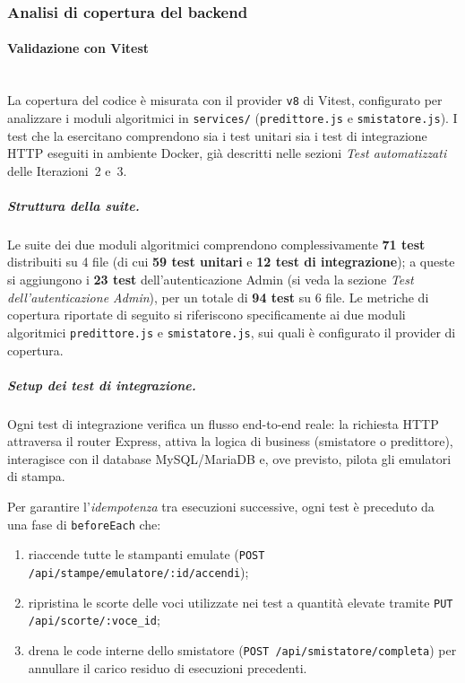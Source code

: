 
\subsubsection{Analisi di copertura del backend}

\paragraph{Validazione con Vitest}\mbox{}\\
La copertura del codice è misurata con il provider \texttt{v8} di Vitest, configurato per analizzare i moduli algoritmici in \texttt{services/} (\texttt{predittore.js} e \texttt{smistatore.js}). I test che la esercitano comprendono sia i test unitari sia i test di integrazione HTTP eseguiti in ambiente Docker, già descritti nelle sezioni \emph{Test automatizzati} delle Iterazioni~2 e~3.

\subparagraph{Struttura della suite.}
Le suite dei due moduli algoritmici comprendono complessivamente \textbf{71 test} distribuiti su 4 file (di cui \textbf{59 test unitari} e \textbf{12 test di integrazione}); a queste si aggiungono i \textbf{23 test} dell'autenticazione Admin (si veda la sezione \emph{Test dell'autenticazione Admin}), per un totale di \textbf{94 test} su 6 file. Le metriche di copertura riportate di seguito si riferiscono specificamente ai due moduli algoritmici \texttt{predittore.js} e \texttt{smistatore.js}, sui quali è configurato il provider di copertura.

\subparagraph{Setup dei test di integrazione.}
Ogni test di integrazione verifica un flusso end-to-end reale: la richiesta HTTP attraversa il router Express, attiva la logica di business (smistatore o predittore), interagisce con il database MySQL/MariaDB e, ove previsto, pilota gli emulatori di stampa.

Per garantire l'\emph{idempotenza} tra esecuzioni successive, ogni test è preceduto da una fase di \texttt{beforeEach} che:
\begin{enumerate}
    \item riaccende tutte le stampanti emulate
          (\texttt{POST /api/stampe/emulatore/:id/accendi});
    \item ripristina le scorte delle voci utilizzate nei test
          a quantità elevate tramite
          \texttt{PUT /api/scorte/:voce\_id};
    \item drena le code interne dello smistatore
          (\texttt{POST /api/smistatore/completa}) per annullare
          il carico residuo di esecuzioni precedenti.
\end{enumerate}

